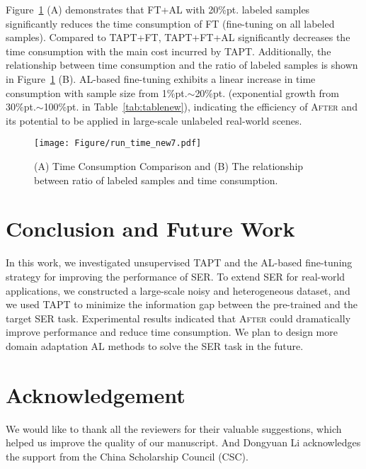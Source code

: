 \documentclass{article}
\begin{document}
Figure~\ref{time} (A) demonstrates that FT+AL with 20\%pt. labeled samples significantly reduces the time consumption of FT (fine-tuning on all labeled samples). Compared to TAPT+FT, TAPT+FT+AL significantly decreases the time consumption with the main cost incurred by TAPT. Additionally, the relationship between time consumption and the ratio of labeled samples is shown in Figure~\ref{time} (B). AL-based fine-tuning exhibits a linear increase in time consumption with sample size from 1\%pt.$\sim$20\%pt. (exponential growth from 30\%pt.$\sim$100\%pt. in Table~\ref{tab:tablenew}), indicating the efficiency of \textsc{After} and its potential to be applied in large-scale unlabeled real-world scenes.



\begin{figure}[t]
\centering
\texttt{[image: Figure/run\_time\_new7.pdf]}
\caption{ (A) Time Consumption Comparison and (B) The relationship between ratio of labeled samples and time consumption.}
\label{time}
\vspace{-0.7cm}
\end{figure}


\section{Conclusion and Future Work}
In this work, we investigated unsupervised TAPT and the AL-based fine-tuning strategy for improving the performance of SER. 
To extend SER for real-world applications, we constructed a large-scale noisy and heterogeneous dataset, and we used TAPT to minimize the information gap between the pre-trained and the target SER task. 
Experimental results indicated that \textsc{After} could dramatically improve performance and reduce time consumption.
We plan to design more domain adaptation AL methods to solve the SER task in the future.


\section*{Acknowledgement}
We would like to thank all the reviewers for their valuable suggestions, which helped us improve the quality of our manuscript.
And Dongyuan Li acknowledges the support from the China Scholarship Council (CSC).






\end{document}
